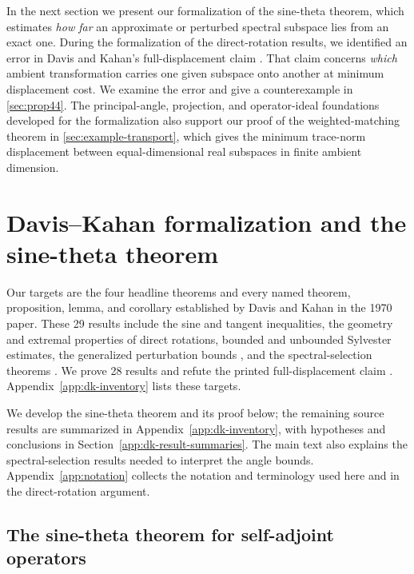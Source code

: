 \documentclass[pdflatex]{sn-jnl} %
\theoremstyle{thmstyleone}
\newcommand{\DKResultCount}{29}
\newcommand{\DKProvedCount}{28}
\begin{document}
In the next section we present our formalization of the sine-theta theorem,
which estimates \emph{how far} an approximate or perturbed spectral subspace
lies from an exact one. During the formalization of the direct-rotation
results, we identified an error in Davis and Kahan's full-displacement
claim \citep[Proposition~4.4]{davis1970rotation}. That claim concerns
\emph{which} ambient transformation carries one given subspace onto another
at minimum displacement cost. We examine the error and give a counterexample
in \cref{sec:prop44}. The principal-angle, projection, and operator-ideal
foundations developed for the formalization also support our proof of the
weighted-matching theorem in \cref{sec:example-transport}, which gives the
minimum trace-norm displacement between equal-dimensional real subspaces
in finite ambient dimension.

\section{Davis--Kahan formalization and the sine-theta theorem}
\label{sec:coverage}

Our targets are the four headline theorems \citep[Section~2]{davis1970rotation} and every
named theorem, proposition, lemma, and corollary established by Davis and
Kahan in the 1970 paper. These \DKResultCount{} results include the sine and
tangent inequalities, the geometry and extremal properties of direct
rotations, bounded and unbounded Sylvester estimates, the generalized
perturbation bounds \citep[Section~6]{davis1970rotation}, and the spectral-selection
theorems \citep[Section~8]{davis1970rotation}. We prove \DKProvedCount{} results and refute the printed
full-displacement claim \citep[Proposition~4.4]{davis1970rotation}.
Appendix~\ref{app:dk-inventory} lists these targets.

We develop the sine-theta theorem and its proof below; the remaining source
results are summarized in Appendix~\ref{app:dk-inventory}, with hypotheses
and conclusions in Section~\ref{app:dk-result-summaries}. The main text also
explains the spectral-selection results needed to interpret the angle bounds.
Appendix~\ref{app:notation} collects the notation and terminology used here
and in the direct-rotation argument.

\subsection{The sine-theta theorem for self-adjoint operators}
\label{sec:sine-theta}
\end{document}
